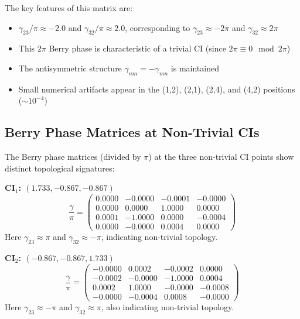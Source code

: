 \documentclass{article}
\begin{document}
The key features of this matrix are:
\begin{itemize}
    \item $\gamma_{23}/\pi \approx -2.0$ and $\gamma_{32}/\pi \approx 2.0$, corresponding to $\gamma_{23} \approx -2\pi$ and $\gamma_{32} \approx 2\pi$
    \item This $2\pi$ Berry phase is characteristic of a trivial CI (since $2\pi \equiv 0 \mod 2\pi$)
    \item The antisymmetric structure $\gamma_{nm} = -\gamma_{mn}$ is maintained
    \item Small numerical artifacts appear in the (1,2), (2,1), (2,4), and (4,2) positions ($\sim 10^{-4}$)
\end{itemize}

\subsection{Berry Phase Matrices at Non-Trivial CIs}

The Berry phase matrices (divided by $\pi$) at the three non-trivial CI points show distinct topological signatures:

\textbf{CI$_1$: $(1.733, -0.867, -0.867)$}
\begin{equation}
\frac{\gamma}{\pi} = 
\begin{pmatrix}
 0.0000 & -0.0000 & -0.0001 & -0.0000 \\
 0.0000 &  0.0000 &  1.0000 &  0.0000 \\
 0.0001 & -1.0000 &  0.0000 & -0.0004 \\
 0.0000 & -0.0000 &  0.0004 &  0.0000
\end{pmatrix}
\end{equation}
Here $\gamma_{23} \approx \pi$ and $\gamma_{32} \approx -\pi$, indicating non-trivial topology.

\textbf{CI$_2$: $(-0.867, -0.867, 1.733)$}
\begin{equation}
\frac{\gamma}{\pi} = 
\begin{pmatrix}
-0.0000 &  0.0002 & -0.0002 &  0.0000 \\
-0.0002 & -0.0000 & -1.0000 &  0.0004 \\
 0.0002 &  1.0000 & -0.0000 & -0.0008 \\
-0.0000 & -0.0004 &  0.0008 & -0.0000
\end{pmatrix}
\end{equation}
Here $\gamma_{23} \approx -\pi$ and $\gamma_{32} \approx \pi$, also indicating non-trivial topology.
\end{document}
